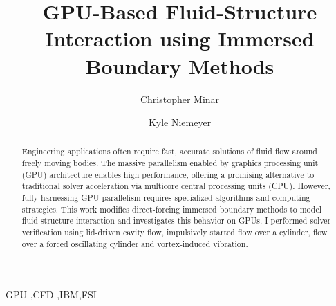 \documentclass[preprint,12pt]{elsarticle}
\begin{document}
\begin{frontmatter}



\title{GPU-Based Fluid-Structure Interaction using Immersed Boundary Methods}


\author{Christopher Minar}
\author{Kyle Niemeyer}

\address{2000 SW Monroe Ave, 204 Rogers Hall, Corvallis, OR 97331}

\begin{abstract}
	Engineering applications often require fast, accurate solutions of fluid flow around freely moving bodies.
	The massive parallelism enabled by graphics processing unit (GPU) architecture enables high performance, offering a promising alternative to traditional solver acceleration via multicore central processing units (CPU).
	However, fully harnessing GPU parallelism requires specialized algorithms and computing strategies.
	This work modifies direct-forcing immersed boundary methods to model fluid-structure interaction and investigates this behavior on GPUs.
	I performed solver verification using lid-driven cavity flow, impulsively started flow over a cylinder, flow over a forced oscillating cylinder and vortex-induced vibration.
\end{abstract}

\begin{keyword}
	GPU \sep CFD \sep IBM\sep FSI
\end{keyword}

\end{frontmatter}

\end{document}
